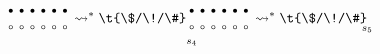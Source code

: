 \begin{primjer}
\begin{multline}
{\begin{array}{@{}c@{}}
    \text\textbullet\\
    \text\textopenbullet
    \end{array}}
    \begin{array}{@{}c@{}}
    \text\textbullet\\
    \text\textopenbullet
    \end{array}
    \begin{array}{@{}c@{}}
    \text\textbullet\\
    \text\textopenbullet
    \end{array}
    \begin{array}{@{}c@{}}
    \text\textbullet\\
    \text\textopenbullet
    \end{array}
    \begin{array}{@{}c@{}}
    \text\textbullet\\
    \text\textopenbullet
    \end{array}
    \begin{array}{@{}c@{}}
    \text\textbullet\\
    \text\textopenbullet
    \end{array}
        \leadsto^*
    \t{\$/\!/\#}
    \underset{\mathclap{s_4}}{\begin{array}{@{}c@{}}
    \text\textbullet\\
    \text\textopenbullet
    \end{array}}
    \begin{array}{@{}c@{}}
    \text\textbullet\\
    \text\textopenbullet
    \end{array}
    \begin{array}{@{}c@{}}
    \text\textbullet\\
    \text\textopenbullet
    \end{array}
    \begin{array}{@{}c@{}}
    \text\textbullet\\
    \text\textopenbullet
    \end{array}
    \begin{array}{@{}c@{}}
    \text\textbullet\\
    \text\textopenbullet
    \end{array}
    \begin{array}{@{}c@{}}
    \text\textbullet\\
    \text\textopenbullet
    \end{array}
        \leadsto^*
    \t{\$/\!/\#}
    \underset{\mathclap{s_5}}{\begin{array}{@{}c@{}}

\end{array}}
\end{multline}
\end{primjer}
